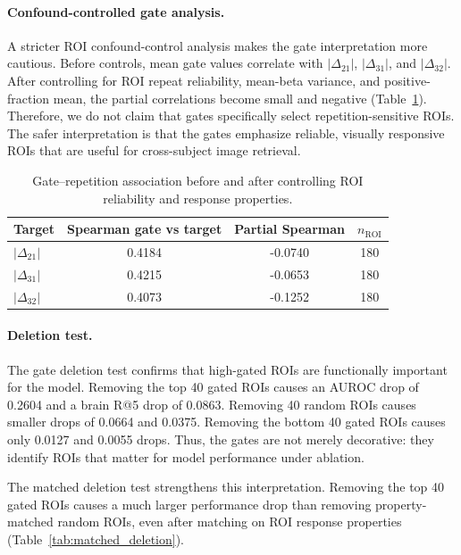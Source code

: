\documentclass{article}
\begin{document}
\paragraph{Confound-controlled gate analysis.}
A stricter ROI confound-control analysis makes the gate interpretation more cautious. Before controls, mean gate values correlate with $|\Delta_{21}|$, $|\Delta_{31}|$, and $|\Delta_{32}|$. After controlling for ROI repeat reliability, mean-beta variance, and positive-fraction mean, the partial correlations become small and negative (Table~\ref{tab:gate_confound}). Therefore, we do not claim that gates specifically select repetition-sensitive ROIs. The safer interpretation is that the gates emphasize reliable, visually responsive ROIs that are useful for cross-subject image retrieval.

\begin{table}[!htbp]
  \centering
  \caption{Gate--repetition association before and after controlling ROI reliability and response properties.}
  \label{tab:gate_confound}
  \scriptsize
  \setlength{\tabcolsep}{5pt}
  \renewcommand{\arraystretch}{1.15}
  \begin{tabular}{lccc}
    \toprule
    Target & Spearman gate vs target & Partial Spearman & $n_{\mathrm{ROI}}$ \\
    \midrule
    $|\Delta_{21}|$ & 0.4184 & -0.0740 & 180 \\
    $|\Delta_{31}|$ & 0.4215 & -0.0653 & 180 \\
    $|\Delta_{32}|$ & 0.4073 & -0.1252 & 180 \\
    \bottomrule
  \end{tabular}
\end{table}

\paragraph{Deletion test.}
The gate deletion test confirms that high-gated ROIs are functionally important for the model. Removing the top 40 gated ROIs causes an AUROC drop of 0.2604 and a brain R@5 drop of 0.0863. Removing 40 random ROIs causes smaller drops of 0.0664 and 0.0375. Removing the bottom 40 gated ROIs causes only 0.0127 and 0.0055 drops. Thus, the gates are not merely decorative: they identify ROIs that matter for model performance under ablation.

The matched deletion test strengthens this interpretation. Removing the top 40 gated ROIs causes a much larger performance drop than removing property-matched random ROIs, even after matching on ROI response properties (Table~\ref{tab:matched_deletion}).
\end{document}
